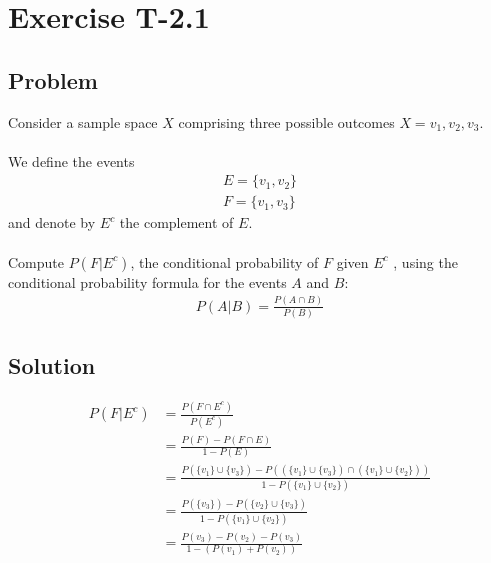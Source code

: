 \section*{Exercise T-2.1}

\subsection*{Problem}
Consider a sample space $X$ comprising three possible outcomes $X = {v_1, v_2, v_3}$.\\ \\
We define the events
\begin{align}
	E = \{v_1,v_2\} \nonumber \\
	F = \{v_1,v_3\}\nonumber 
\end{align}
and denote by $E^c$ the complement of $E$.\\ \\
Compute $P(F|E^c)$, the conditional probability of $F$ given $E^c$ , using the conditional
probability formula for the events $A$ and $B$:\\

\begin{align}
P(A|B)=  \frac{P(A \cap B)}{P(B)} \nonumber 
\end{align}


\subsection*{Solution}

\begin{align}
	P(F|E^c) &= \frac{P(F\cap E^c)}{P(E^c)} \nonumber \\
	&= \frac{P(F) - P(F \cap E)}{1 - P(E)} \nonumber \\
	&= \frac{P( \{v_1\} \cup \{v_3\} ) - P(( \{v_1\} \cup \{v_3\} ) \cap (\{v_1\} \cup \{v_2\}))}{1 - P(\{v_1\} \cup \{v_2\})} \nonumber \\
	&= \frac{P( \{v_3\} ) - P(\{v_2\} \cup \{v_3\})}{1 - P(\{v_1\} \cup \{v_2\})} \nonumber \\
	&= \frac{P(v_3) - P(v_2) - P(v_3)}{1-(P(v_1)+P(v_2))}\nonumber
\end{align}
